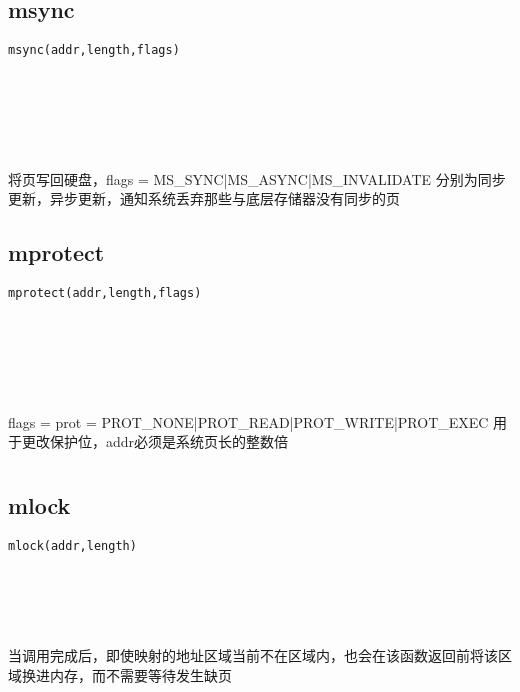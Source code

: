 \documentclass[10pt,a4paper]{article}
\begin{document}
\subsection{msync}
\begin{spacing}{2.0}
\lstset{language=C,numbers=none}
\begin{lstlisting}
msync(addr,length,flags)
\end{lstlisting}
{\large\color[rgb]{0.2,0.4,0.6}{addr:}} \\
{\large\color[rgb]{0.2,0.4,0.6}{length:}} \\
{\large\color[rgb]{0.2,0.4,0.6}{flags:}}
\paragraph{ \ \ }将页写回硬盘，flags = MS\_SYNC|MS\_ASYNC|MS\_INVALIDATE 分别为同步更新，异步更新，通知系统丢弃那些与底层存储器没有同步的页
\end{spacing}

\subsection{mprotect}
\begin{spacing}{2.0}
\lstset{language=C,numbers=none}
\begin{lstlisting}
mprotect(addr,length,flags)
\end{lstlisting}
{\large\color[rgb]{0.2,0.4,0.6}{addr:}} \\
{\large\color[rgb]{0.2,0.4,0.6}{length:}} \\
{\large\color[rgb]{0.2,0.4,0.6}{flags:}}
\paragraph{ \ \ }flags = prot = PROT\_NONE|PROT\_READ|PROT\_WRITE|PROT\_EXEC 用于更改保护位，addr必须是系统页长的整数倍
\end{spacing}

\section{\color[rgb]{0.2,0.4,0.6}{内存锁}}
\subsection{mlock}
\begin{spacing}{2.0}
\lstset{language=C,numbers=none}
\begin{lstlisting}
mlock(addr,length)
\end{lstlisting}
{\large\color[rgb]{0.2,0.4,0.6}{addr:}} \\
{\large\color[rgb]{0.2,0.4,0.6}{length:}}
\paragraph{ \ \ }当调用完成后，即使映射的地址区域当前不在区域内，也会在该函数返回前将该区域换进内存，而不需要等待发生缺页
\end{spacing}
\end{document}
